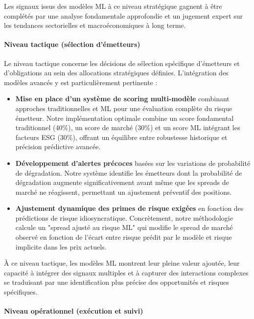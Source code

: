 Les signaux issus des modèles ML à ce niveau stratégique gagnent à être complétés par une analyse fondamentale approfondie et un jugement expert sur les tendances sectorielles et macroéconomiques à long terme.

\paragraph{Niveau tactique (sélection d'émetteurs)}

Le niveau tactique concerne les décisions de sélection spécifique d'émetteurs et d'obligations au sein des allocations stratégiques définies. L'intégration des modèles avancés y est particulièrement pertinente :

\begin{itemize}
    \item \textbf{Mise en place d'un système de scoring multi-modèle} combinant approches traditionnelles et ML pour une évaluation complète du risque émetteur. Notre implémentation optimale combine un score fondamental traditionnel (40\%), un score de marché (30\%) et un score ML intégrant les facteurs ESG (30\%), offrant un équilibre entre robustesse historique et précision prédictive avancée.
    
    \item \textbf{Développement d'alertes précoces} basées sur les variations de probabilité de dégradation. Notre système identifie les émetteurs dont la probabilité de dégradation augmente significativement avant même que les spreads de marché ne réagissent, permettant un ajustement préventif des positions.
    
    \item \textbf{Ajustement dynamique des primes de risque exigées} en fonction des prédictions de risque idiosyncratique. Concrètement, notre méthodologie calcule un "spread ajusté au risque ML" qui modifie le spread de marché observé en fonction de l'écart entre risque prédit par le modèle et risque implicite dans les prix actuels.
\end{itemize}

À ce niveau tactique, les modèles ML montrent leur pleine valeur ajoutée, leur capacité à intégrer des signaux multiples et à capturer des interactions complexes se traduisant par une identification plus précise des opportunités et risques spécifiques.

\paragraph{Niveau opérationnel (exécution et suivi)}

